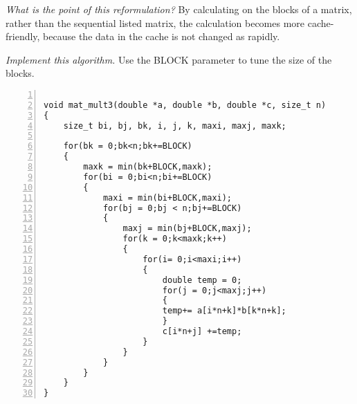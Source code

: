 \documentclass{article}
\begin{document}
\begin{ExerciseList}
\Exercise
{}

\Question
\emph{What is the point of this reformulation?}
\Answer By calculating on the blocks of a matrix, rather than the sequential listed matrix, the calculation becomes more cache-friendly, because the data in the cache is not changed as rapidly. 


\Question
\emph{Implement this algorithm.} Use the BLOCK parameter to tune the
size of the blocks.

\begin{lstlisting}[basicstyle=\small\sffamily,
keywords={break,case,const,continue,default,else,enum,
for,if,return,switch,while,do,long,void,int,float,double,
char,struct,typedef,include,size\_t},
keywordstyle={\color{blue}},
comment={[l]{//}}, morecomment={[s]{/*}{*/}}, commentstyle=\itshape,
columns={[l]flexible}, numbers=left, numberstyle=\tiny,
frameround=fftt, frame=shadowbox, captionpos=b,
caption={Matrix multiplication function.},
label=LST:MatMulFunc3]

void mat_mult3(double *a, double *b, double *c, size_t n)
{
    size_t bi, bj, bk, i, j, k, maxi, maxj, maxk;

    for(bk = 0;bk<n;bk+=BLOCK)
    {
        maxk = min(bk+BLOCK,maxk);
        for(bi = 0;bi<n;bi+=BLOCK)
        {
            maxi = min(bi+BLOCK,maxi);
            for(bj = 0;bj < n;bj+=BLOCK)
            {
                maxj = min(bj+BLOCK,maxj);
                for(k = 0;k<maxk;k++)
                {
                    for(i= 0;i<maxi;i++)
                    {
                        double temp = 0;
                        for(j = 0;j<maxj;j++)
                        {
                        temp+= a[i*n+k]*b[k*n+k];
                        }
                        c[i*n+j] +=temp;
                    }
                }
            }
        }
    }
}
\end{lstlisting}


\end{ExerciseList}
\end{document}
